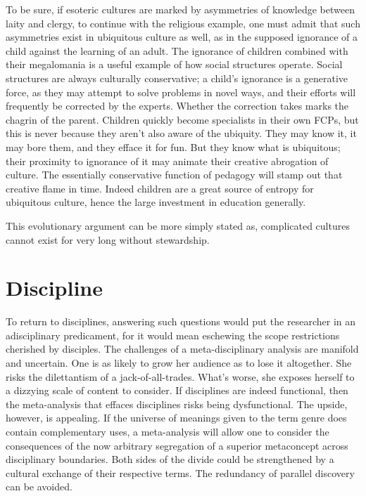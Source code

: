 \documentclass[]{book}
\theoremstyle{definition}
\theoremstyle{definition}
\theoremstyle{definition}
\theoremstyle{remark}
\begin{document}
To be sure, if esoteric cultures are marked by asymmetries of knowledge
between laity and clergy, to continue with the religious example, one
must admit that such asymmetries exist in ubiquitous culture as well, as
in the supposed ignorance of a child against the learning of an adult.
The ignorance of children combined with their megalomania is a useful
example of how social structures operate. Social structures are always
culturally conservative; a child's ignorance is a generative force, as
they may attempt to solve problems in novel ways, and their efforts will
frequently be corrected by the experts. Whether the correction takes
marks the chagrin of the parent. Children quickly become specialists in
their own FCPs, but this is never because they aren't also aware of the
ubiquity. They may know it, it may bore them, and they efface it for
fun. But they know what is ubiquitous; their proximity to ignorance of
it may animate their creative abrogation of culture. The essentially
conservative function of pedagogy will stamp out that creative flame in
time. Indeed children are a great source of entropy for ubiquitous
culture, hence the large investment in education generally.

This evolutionary argument can be more simply stated as, complicated
cultures cannot exist for very long without stewardship.

\hypertarget{discipline}{%
\section{Discipline}\label{discipline}}

To return to disciplines, answering such questions would put the
researcher in an adisciplinary predicament, for it would mean eschewing
the scope restrictions cherished by disciples. The challenges of a
meta-disciplinary analysis are manifold and uncertain. One is as likely
to grow her audience as to lose it altogether. She risks the
dilettantism of a jack-of-all-trades. What's worse, she exposes herself
to a dizzying scale of content to consider. If disciplines are indeed
functional, then the meta-analysis that effaces disciplines risks being
dysfunctional. The upside, however, is appealing. If the universe of
meanings given to the term genre does contain complementary uses, a
meta-analysis will allow one to consider the consequences of the now
arbitrary segregation of a superior metaconcept across disciplinary
boundaries. Both sides of the divide could be strengthened by a cultural
exchange of their respective terms. The redundancy of parallel discovery
can be avoided.
\end{document}
